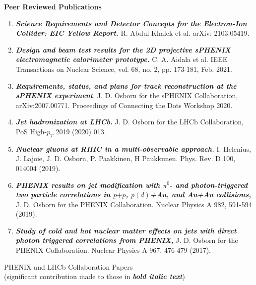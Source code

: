 \documentclass[11pt]{article}
\begin{document}
\begin{flushleft}

\vspace{7pt}
\Large\textbf{Peer Reviewed Publications}\\
\vspace{2pt}
\begin{center}
\normalsize
\begin{enumerate}
	\item \textbf{\textit{Science Requirements and Detector Concepts for the Electron-Ion Collider: EIC Yellow Report.}} R. Abdul Khalek et al. arXiv: 2103.05419. 
	\item \textbf{\textit{Design and beam test results for the 2D projective sPHENIX electromagnetic calorimeter prototype.}} C. A. Aidala et al. IEEE Transactions on Nuclear Science, vol. 68, no. 2, pp. 173-181, Feb. 2021.
	
	\item\textbf{\textit{Requirements, status, and plans for track reconstruction at the sPHENIX experiment}}. J. D. Osborn for the sPHENIX Collaboration, arXiv:2007.00771. Proceedings of Connecting the Dots Workshop 2020.
	\item \textbf{\textit{Jet hadronization at LHCb.}} J. D. Osborn for the LHCb Collaboration, PoS High-$p_T$ 2019 (2020) 013.
	\item \textbf{\textit{Nuclear gluons at RHIC in a multi-observable approach.}} I. Helenius, J. Lajoie, J. D. Osborn, P. Paakkinen, H Paukkunen. Phys. Rev. D 100, 014004 (2019).
	\item \textbf{\textit{PHENIX results on jet modification with $\pi^0$- and photon-triggered two particle correlations in $p$$+$$p$, $p(d)$+Au, and Au+Au collisions,}} J. D. Osborn for the PHENIX Collaboration. Nuclear Physics A 982, 591-594 (2019).
	\item \textbf{\textit{Study of cold and hot nuclear matter effects on jets with direct photon triggered correlations from PHENIX,}} J. D. Osborn for the PHENIX Collaboration. Nuclear Physics A 967, 476-479 (2017).
\end{enumerate}

\vspace{14pt}
\begin{flushleft}
\large PHENIX and LHCb Collaboration Papers\\ (significant contribution made to those in \textbf{\textit{bold italic text}})\\
\end{flushleft}


\end{center}
\end{flushleft}
\end{document}
